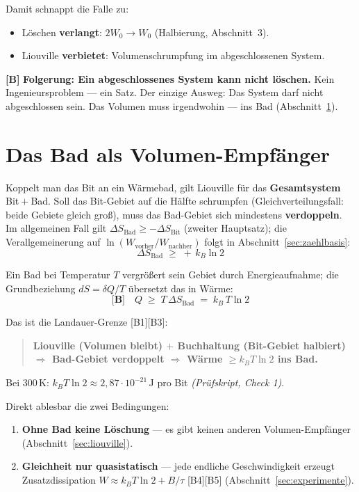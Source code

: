 Damit schnappt die Falle zu:
\begin{itemize}[leftmargin=1.4em,itemsep=0.2em]
  \item Löschen \textbf{verlangt}: $2W_0 \to W_0$ (Halbierung, Abschnitt~3).
  \item Liouville \textbf{verbietet}: Volumenschrumpfung im abgeschlossenen System.
\end{itemize}

\textbf{[B]} \textbf{Folgerung: Ein abgeschlossenes System kann nicht löschen.} Kein
Ingenieursproblem --- ein Satz. Der einzige Ausweg: Das System darf nicht
abgeschlossen sein. Das Volumen muss irgendwohin --- ins Bad
(Abschnitt~\ref{sec:bad}).

\section{Das Bad als Volumen-Empfänger}
\label{sec:bad}

Koppelt man das Bit an ein Wärmebad, gilt Liouville für das \textbf{Gesamtsystem}
Bit${}+{}$Bad. Soll das Bit-Gebiet auf die Hälfte schrumpfen
(Gleichverteilungsfall: beide Gebiete gleich groß), muss das Bad-Gebiet sich
mindestens \textbf{verdoppeln}. Im allgemeinen Fall gilt
$\Delta S_{\text{Bad}} \ge -\Delta S_{\text{Bit}}$ (zweiter Hauptsatz); die
Verallgemeinerung auf $\ln(W_{\text{vorher}}/W_{\text{nachher}})$ folgt in
Abschnitt~\ref{sec:zaehlbasis}:
\[
  \Delta S_{\text{Bad}} \;\ge\; +\,k_B \ln 2
\]

Ein Bad bei Temperatur $T$ vergrößert sein Gebiet durch Energieaufnahme; die
Grundbeziehung $dS = \delta Q/T$ übersetzt das in Wärme:
\[
  \textbf{[B]}\quad Q \;\ge\; T\,\Delta S_{\text{Bad}} \;=\; k_B\,T \ln 2
\]

Das ist die Landauer-Grenze [B1][B3]:

\begin{quote}
\textbf{Liouville (Volumen bleibt) $+$ Buchhaltung (Bit-Gebiet halbiert)
$\Rightarrow$ Bad-Gebiet verdoppelt $\Rightarrow$ Wärme $\ge k_B T \ln 2$ ins
Bad.}
\end{quote}

Bei 300\,K: $k_B T \ln 2 \approx 2{,}87\cdot10^{-21}$\,J pro Bit
\emph{(Prüfskript, Check 1)}.

Direkt ablesbar die zwei Bedingungen:
\begin{enumerate}[leftmargin=1.6em,itemsep=0.2em]
  \item \textbf{Ohne Bad keine Löschung} --- es gibt keinen anderen
        Volumen-Empfänger (Abschnitt~\ref{sec:liouville}).
  \item \textbf{Gleichheit nur quasistatisch} --- jede endliche Geschwindigkeit
        erzeugt Zusatzdissipation $W \approx k_B T \ln 2 + B/\tau$ [B4][B5]
        (Abschnitt~\ref{sec:experimente}).
\end{enumerate}

